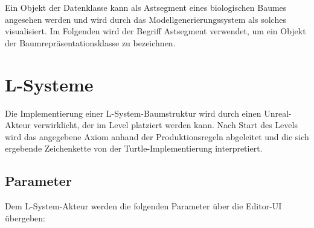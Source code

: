 Ein Objekt der Datenklasse kann als Astsegment eines biologischen Baumes angesehen werden und wird durch das Modellgenerierungssystem als solches visualisiert. Im Folgenden wird der Begriff \glqq Astsegment\grqq{} verwendet, um ein Objekt der Baumrepräsentationsklasse zu bezeichnen.

\section{L-Systeme}

Die Implementierung einer L-System-Baumstruktur wird durch einen Unreal-Akteur verwirklicht, der im Level platziert werden kann. Nach Start des Levels wird das angegebene Axiom anhand der Produktionsregeln abgeleitet und die sich ergebende Zeichenkette von der Turtle-Implementierung interpretiert.

\subsection{Parameter}

Dem L-System-Akteur werden die folgenden Parameter über die Editor-UI übergeben:


